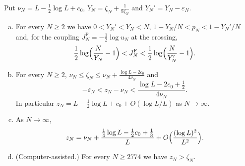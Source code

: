 \begin{corollary}\label{cor:every-n}
Put $\nu_N=L-\frac12\log L+c_0$, $Y_N=\zeta_N+\frac1{8\zeta_N}$ and
$Y_N'=Y_N-\varepsilon_N$.
\begin{enumerate}[(a)]
\item For every $N\ge2$ we have $0<Y_N'<Y_N<N$,
$1-Y_N/N<p_N<1-Y_N'/N$ and, for the coupling
$J_N^{\mathrm F}=-\frac12\log u_N$ at the crossing,
\[
\frac12\log\Bigl(\frac N{Y_N}-1\Bigr)<J_N^{\mathrm F}<\frac12\log\Bigl(\frac N{Y_N'}-1\Bigr).
\]
\item For every $N\ge2$, $\nu_N\le\zeta_N\le\nu_N+\frac{\log L-2c_0}{4\nu_N}$ and
\begin{equation}\label{eq:secondorder}
-\varepsilon_N<z_N-\nu_N<\frac{\log L-2c_0+\frac12}{4\nu_N}.
\end{equation}
In particular $z_N=L-\frac12\log L+c_0+O(\log L/L)$ as $N\to\infty$.
\item As $N\to\infty$,
\begin{equation}\label{eq:thirdorder}
z_N=\nu_N+\frac{\frac14\log L-\frac12c_0+\frac18}{L}+O\Bigl(\frac{(\log L)^2}{L^2}\Bigr).
\end{equation}
\item (Computer-assisted.) For every $N\ge2774$ we have $z_N>\zeta_N$.
\end{enumerate}
\end{corollary}

